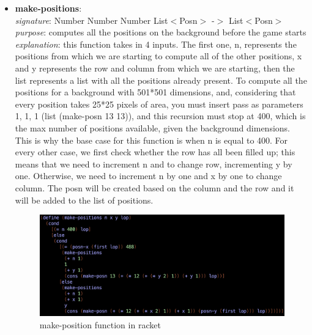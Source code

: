 \documentclass{article}
\begin{document}
	\begin{itemize}
		\item \textbf{make-positions}: \\
			\emph{signature}: Number Number Number List$<$Posn$>$ -$>$ List$<$Posn$>$ \\
			\emph{purpose}: computes all the positions on the background before the game starts \\
			\emph{explanation}: this function takes in 4 inputs. The first one, n, represents the positions from which we are starting to compute all of the other positions, x and y represents the row and column from which we are starting, then the list represents a list with all the positions already present. To compute all the positions for a background with 501*501 dimensions, and, considering that every position takes 25*25 pixels of area, you must insert pass as parameters 1, 1, 1 (list (make-posn 13 13)), and this recursion must stop at 400, which is the max number of positions available, given the background dimensions. This is why the base case for this function is when n is equal to 400. For every other case, we first check whether the row has all been filled up; this means that we need to increment n and to change row, incrementing y by one. Otherwise, we need to increment n by one and x by one to change column. The posn will be created based on the column and the row and it will be added to the list of positions.
			\begin{figure}[h!]
				\centering
				\includegraphics[width=.6\linewidth]{make-position.png}
				\caption{make-position function in racket}
			\end{figure}
			

\end{itemize}
\end{document}
